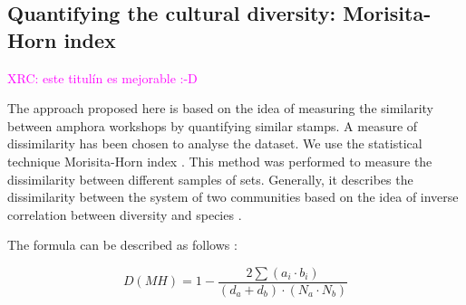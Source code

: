 \documentclass[review]{elsarticle}
\newcommand{\memo}[2]{\textcolor{#1}{#2}}
\newcommand{\xavi}[1]{\memo{magenta}{XRC: #1\\}}
\begin{document}



\subsection{Quantifying the cultural diversity: Morisita-Horn index}


\xavi{este titulín es mejorable :-D}


The approach proposed here is based on the idea of measuring the similarity between amphora workshops by quantifying similar stamps. A measure of dissimilarity has been chosen to analyse the dataset. We use the statistical technique Morisita-Horn index \citep{morisita_measuring_1959, horn_measurement_1966}. This method was performed to measure the dissimilarity between different samples of sets. Generally, it describes the dissimilarity between the system of two communities based on the idea of inverse correlation between diversity and species \citep{magurran_why_1988}.

The formula can be described as follows \citep{magurran_measuring_2013}:

\begin{equation}
D(MH) = 1- \frac{2 \sum(a_{i} \cdot b_{i})}{(d_{a} + d_{b}) \cdot (N_{a} \cdot N_{b})}
\end{equation} \\
\end{document}
